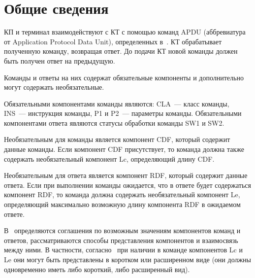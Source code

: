 \section{Общие сведения}\label{CMDS.Intro}

КП и терминал взаимодействуют с КТ с помощью команд APDU 
(аббревиатура от Application Protocol Data Unit), определенных в~\cite{APDU}. 
КТ обрабатывает полученную команду, возвращая ответ. До подачи КТ новой команды 
должен быть получен ответ на предыдущую. 

Команды и ответы на них содержат обязательные компоненты и дополнительно 
могут содержать необязательные.  

Обязательными компонентами команды являются: CLA~--- класс команды, INS~---
инструкция команды, P1 и P2~--- параметры команды. Обязательными компонентами
ответа являются статусы обработки команды SW1 и SW2.

Необязательным для команды является компонент CDF, который содержит данные 
команды. Если компонент CDF присутствует, то команда должна также содержать 
необязательный компонент Lc, определяющий длину CDF. 

Необязательным для ответа является компонент RDF, который содержит данные 
ответа. Если при выполнении команды ожидается, что в ответе будет 
содержаться компонент RDF, то команда должна содержать необязательный 
компонент Le, определяющий максимально возможную длину компонента RDF в 
ожидаемом ответе. 

В~\cite{APDU} определяются соглашения по возможным значениям компонентов команд и 
ответов, рассматриваются способы представления компонентов и 
взаимосвязь между ними. В частности, согласно~\cite{APDU} при наличии в команде 
компонентов Lc и Le они могут быть представлены в коротком или расширенном 
виде (они должны одновременно иметь либо короткий, либо расширенный вид). 

